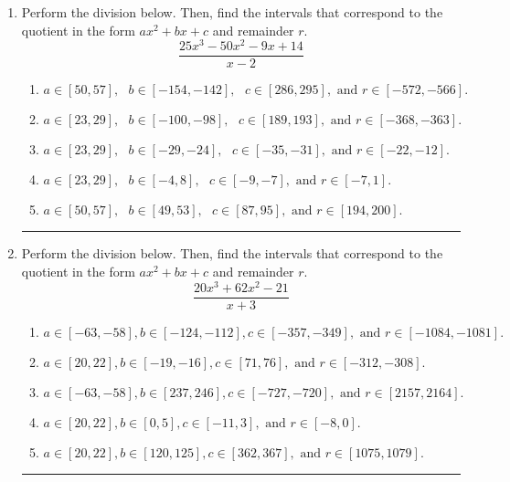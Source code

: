 \documentclass[14pt]{extbook}
\newcommand{\litem}[1]{\item#1\hspace*{-1cm}\rule{\textwidth}{0.4pt}}
\begin{document}
\begin{enumerate}
{\begin{enumerate}[label=\Alph*.]
\end{enumerate} }
\litem{
Perform the division below. Then, find the intervals that correspond to the quotient in the form $ax^2+bx+c$ and remainder $r$.\[ \frac{25x^{3} -50 x^{2} -9 x + 14}{x -2} \]\begin{enumerate}[label=\Alph*.]
\item \( a \in [50, 57], \text{   } b \in [-154, -142], \text{   } c \in [286, 295], \text{   and   } r \in [-572, -566]. \)
\item \( a \in [23, 29], \text{   } b \in [-100, -98], \text{   } c \in [189, 193], \text{   and   } r \in [-368, -363]. \)
\item \( a \in [23, 29], \text{   } b \in [-29, -24], \text{   } c \in [-35, -31], \text{   and   } r \in [-22, -12]. \)
\item \( a \in [23, 29], \text{   } b \in [-4, 8], \text{   } c \in [-9, -7], \text{   and   } r \in [-7, 1]. \)
\item \( a \in [50, 57], \text{   } b \in [49, 53], \text{   } c \in [87, 95], \text{   and   } r \in [194, 200]. \)

\end{enumerate} }
\litem{
Perform the division below. Then, find the intervals that correspond to the quotient in the form $ax^2+bx+c$ and remainder $r$.\[ \frac{20x^{3} +62 x^{2} -21}{x + 3} \]\begin{enumerate}[label=\Alph*.]
\item \( a \in [-63, -58], b \in [-124, -112], c \in [-357, -349], \text{ and } r \in [-1084, -1081]. \)
\item \( a \in [20, 22], b \in [-19, -16], c \in [71, 76], \text{ and } r \in [-312, -308]. \)
\item \( a \in [-63, -58], b \in [237, 246], c \in [-727, -720], \text{ and } r \in [2157, 2164]. \)
\item \( a \in [20, 22], b \in [0, 5], c \in [-11, 3], \text{ and } r \in [-8, 0]. \)
\item \( a \in [20, 22], b \in [120, 125], c \in [362, 367], \text{ and } r \in [1075, 1079]. \)


\end{enumerate}}
\end{enumerate}
\end{document}
